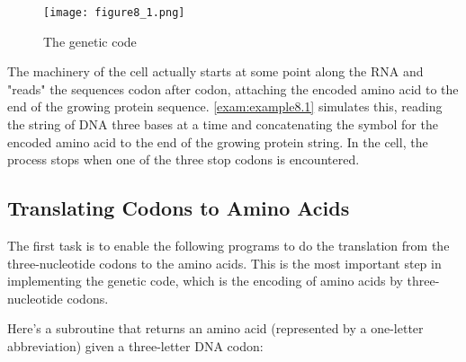 \begin{figure}
  \centering
  \texttt{[image: figure8\_1.png]}
  \caption{The genetic code}
  \label{fig:figure8.1}
\end{figure}

The machinery of the cell actually starts at some point along the RNA and "reads" the sequences codon after codon, attaching the encoded amino acid to the end of the growing protein sequence.  \autoref{exam:example8.1} simulates this, reading the string of DNA three bases at a time and concatenating the symbol for the encoded amino acid to the end of the growing protein string. In the cell, the process stops when one of the three stop codons is encountered. 

\subsection{Translating Codons to Amino Acids}
The first task is to enable the following programs to do the translation from the three-nucleotide codons to the amino acids. This is the most important step in implementing the genetic code, which is the encoding of amino acids by three-nucleotide codons.

Here's a subroutine that returns an amino acid (represented by a one-letter abbreviation) given a three-letter DNA codon: 

